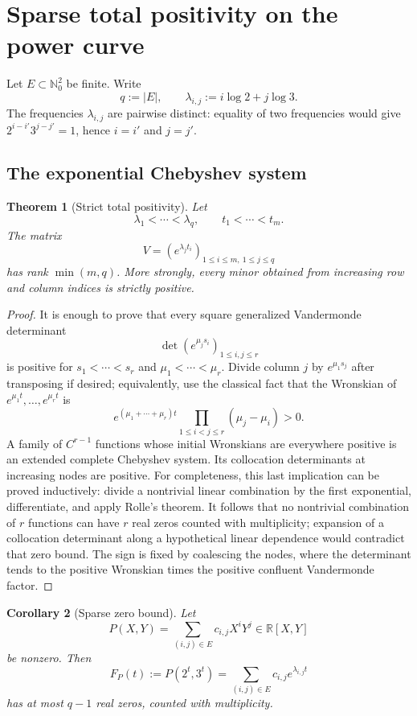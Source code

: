 \documentclass[11pt,oneside]{article}
\newtheorem{theorem}{Theorem}[section]
\newtheorem{corollary}[theorem]{Corollary}
\theoremstyle{definition}
\theoremstyle{remark}
\newcommand{\Nzero}{\mathbb N_0}
\newcommand{\R}{\mathbb R}
\begin{document}
\section{Sparse total positivity on the power curve}
\label{sec:total-positivity}

Let $E\subset\Nzero^2$ be finite.  Write
\[
 q:=|E|,\qquad \lambda_{i,j}:=i\log2+j\log3.
\]
The frequencies $\lambda_{i,j}$ are pairwise distinct: equality of two frequencies would give
$2^{i-i'}3^{j-j'}=1$, hence $i=i'$ and $j=j'$.

\subsection{The exponential Chebyshev system}

\begin{theorem}[Strict total positivity]
\label{thm:strict-total-positivity}
Let
\[
 \lambda_1<\cdots<\lambda_q,
 \qquad t_1<\cdots<t_m.
\]
The matrix
\[
 V=(e^{\lambda_jt_i})_{1\le i\le m,\ 1\le j\le q}
\]
has rank $\min(m,q)$.  More strongly, every minor obtained from increasing row and column
indices is strictly positive.
\end{theorem}

\begin{proof}
It is enough to prove that every square generalized Vandermonde determinant
\[
 \det(e^{\mu_j s_i})_{1\le i,j\le r}
\]
is positive for $s_1<\cdots<s_r$ and $\mu_1<\cdots<\mu_r$.  Divide column $j$ by
$e^{\mu_1s_j}$ after transposing if desired; equivalently, use the classical fact that the
Wronskian of $e^{\mu_1t},\ldots,e^{\mu_rt}$ is
\[
 e^{(\mu_1+\cdots+\mu_r)t}\prod_{1\le i<j\le r}(\mu_j-\mu_i)>0.
\]
A family of $C^{r-1}$ functions whose initial Wronskians are everywhere positive is an
extended complete Chebyshev system.  Its collocation determinants at increasing nodes are
positive.  For completeness, this last implication can be proved inductively: divide a
nontrivial linear combination by the first exponential, differentiate, and apply Rolle's
theorem.  It follows that no nontrivial combination of $r$ functions can have $r$ real zeros
counted with multiplicity; expansion of a collocation determinant along a hypothetical linear
dependence would contradict that zero bound.  The sign is fixed by coalescing the nodes, where
the determinant tends to the positive Wronskian times the positive confluent Vandermonde
factor.
\end{proof}

\begin{corollary}[Sparse zero bound]
\label{cor:sparse-zero-bound}
Let
\[
 P(X,Y)=\sum_{(i,j)\in E}c_{i,j}X^iY^j\in\R[X,Y]
\]
be nonzero.  Then
\[
 F_P(t):=P(2^t,3^t)
       =\sum_{(i,j)\in E}c_{i,j}e^{\lambda_{i,j}t}
\]
has at most $q-1$ real zeros, counted with multiplicity.
\end{corollary}
\end{document}
